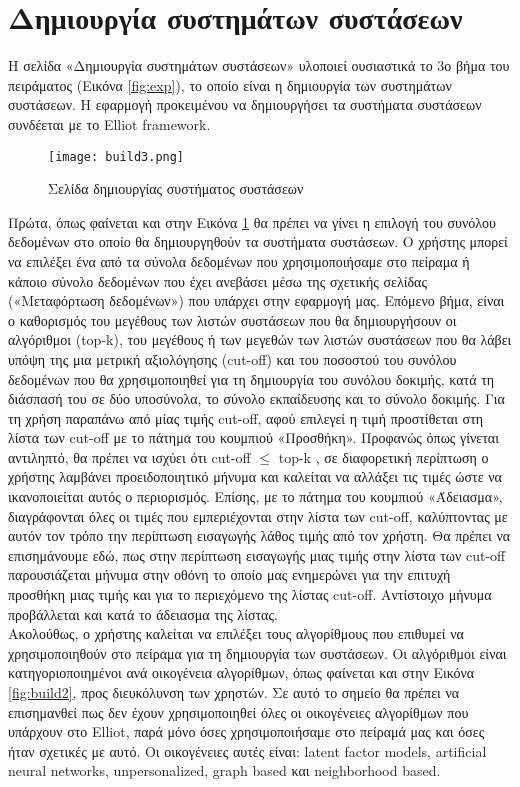 \section{Δημιουργία συστημάτων συστάσεων}
\noindent Η σελίδα «Δημιουργία συστημάτων συστάσεων» υλοποιεί ουσιαστικά το 3ο βήμα του πειράματος (Εικόνα \ref{fig:exp}), το οποίο είναι η δημιουργία των συστημάτων συστάσεων.
Η εφαρμογή προκειμένου να δημιουργήσει τα συστήματα συστάσεων συνδέεται με το Elliot framework.\\
\begin{figure}[H]
	\centering
	\texttt{[image: build3.png]}
	\caption{Σελίδα δημιουργίας συστήματος συστάσεων}
	\label{fig:build}
\end{figure}
\noindent Πρώτα, όπως φαίνεται και στην Εικόνα \ref{fig:build} θα πρέπει να γίνει η επιλογή του συνόλου δεδομένων στο οποίο θα δημιουργηθούν τα συστήματα συστάσεων. Ο χρήστης μπορεί να επιλέξει ένα από τα σύνολα δεδομένων που χρησιμοποιήσαμε στο πείραμα ή κάποιο σύνολο δεδομένων που έχει ανεβάσει μέσω της σχετικής σελίδας («Μεταφόρτωση δεδομένων») που υπάρχει στην εφαρμογή μας. Επόμενο βήμα, είναι ο καθορισμός του μεγέθους των λιστών συστάσεων που θα δημιουργήσουν οι αλγόριθμοι (top-k), του μεγέθους ή των μεγεθών των λιστών συστάσεων που θα λάβει υπόψη της μια μετρική αξιολόγησης (cut-off) και του ποσοστού του συνόλου δεδομένων που θα χρησιμοποιηθεί για τη δημιουργία του συνόλου δοκιμής, κατά τη διάσπασή του σε δύο υποσύνολα, το σύνολο εκπαίδευσης και το σύνολο δοκιμής. Για τη χρήση παραπάνω από μίας τιμής cut-off, αφού επιλεγεί η τιμή προστίθεται στη λίστα των cut-off με το πάτημα του κουμπιού «Προσθήκη». Προφανώς όπως γίνεται αντιληπτό, θα πρέπει να ισχύει ότι cut-off  $\leq$ top-k , σε διαφορετική περίπτωση ο χρήστης λαμβάνει προειδοποιητικό μήνυμα και καλείται να αλλάξει τις τιμές ώστε να ικανοποιείται αυτός ο περιορισμός. Επίσης, με το πάτημα του κουμπιού «Άδειασμα», διαγράφονται όλες οι τιμές που εμπεριέχονται στην λίστα των cut-off, καλύπτοντας με αυτόν τον τρόπο την περίπτωση εισαγωγής λάθος τιμής από τον χρήστη. Θα πρέπει να επισημάνουμε εδώ, πως στην περίπτωση εισαγωγής μιας τιμής στην λίστα των cut-off παρουσιάζεται μήνυμα στην οθόνη το οποίο μας ενημερώνει για την επιτυχή προσθήκη μιας τιμής και για το περιεχόμενο της λίστας cut-off. Αντίστοιχο μήνυμα προβάλλεται και κατά το άδειασμα της λίστας.\\
Ακολούθως, ο χρήστης καλείται να επιλέξει τους αλγορίθμους που επιθυμεί να χρησιμοποιηθούν στο πείραμα για τη δημιουργία των συστάσεων. Οι αλγόριθμοι είναι κατηγοριοποιημένοι ανά οικογένεια αλγορίθμων, όπως φαίνεται και στην Εικόνα \ref{fig:build2}, προς διευκόλυνση των χρηστών. Σε αυτό το σημείο θα πρέπει να επισημανθεί πως δεν έχουν χρησιμοποιηθεί όλες οι οικογένειες αλγορίθμων που υπάρχουν στο Elliot, παρά μόνο όσες χρησιμοποιήσαμε στο πείραμά μας και όσες ήταν σχετικές με αυτό. Οι οικογένειες αυτές είναι: latent factor models, artificial neural networks, unpersonalized, graph based και neighborhood based.
